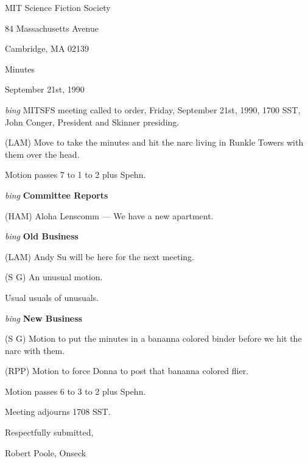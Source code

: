 \setlength{\topmargin}{-0.5in}
\setlength{\oddsidemargin}{0.0in}
\setlength{\evensidemargin}{0.0in}
\setlength{\textheight}{9in}
\setlength{\textwidth}{6.5in}



\begin{center}
MIT Science Fiction Society

84 Massachusetts Avenue

Cambridge, MA 02139

\vspace{0.2in}
Minutes

September 21st, 1990

\end{center}
 
\vspace{0.15in}
{\em bing\/}  MITSFS meeting called to order, Friday, September 21st, 1990,
1700 SST, John Conger, President and Skinner presiding.

(LAM) Move to take the minutes and hit the narc living in Runkle Towers with
them over the head.

Motion passes 7 to 1 to 2 plus Spehn.

\vspace{0.15in}
{\em bing\/} {\bf Committee Reports\/}

(HAM) Aloha Lenscomm --- We have a new apartment.

\vspace{.15in}
{\em bing\/} {\bf Old Business\/}

(LAM) Andy Su will be here for the next meeting.

(S G) An unusual motion.

Usual usuals of unusuals.

\vspace{0.15in}
{\em bing\/} {\bf New Business\/}

(S G) Motion to put the minutes in a bananna colored binder before we hit the
narc with them.

(RPP) Motion to force Donna to post that bananna colored flier.

Motion passes 6 to 3 to 2 plus Spehn.

Meeting adjourns 1708 SST.

\vspace{0.15in}
\begin{center}
Respectfully submitted,

Robert Poole, Onseck
\end{center}


